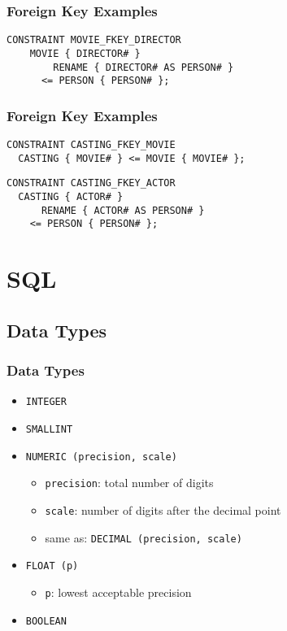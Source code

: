 \documentclass[dvipsnames]{beamer}
\theoremstyle{plain}
\begin{document}
\begin{frame}[fragile]
  \frametitle{Foreign Key Examples}

  \begin{lstlisting}
CONSTRAINT MOVIE_FKEY_DIRECTOR
    MOVIE { DIRECTOR# }
        RENAME { DIRECTOR# AS PERSON# }
      <= PERSON { PERSON# };
  \end{lstlisting}
\end{frame}

\begin{frame}[fragile]
  \frametitle{Foreign Key Examples}

  \begin{lstlisting}
CONSTRAINT CASTING_FKEY_MOVIE
  CASTING { MOVIE# } <= MOVIE { MOVIE# };
  \end{lstlisting}

  \begin{lstlisting}
CONSTRAINT CASTING_FKEY_ACTOR
  CASTING { ACTOR# }
      RENAME { ACTOR# AS PERSON# }
    <= PERSON { PERSON# };
  \end{lstlisting}
\end{frame}

\lstset{language=FullSQL}

\section{SQL}

\subsection{Data Types}

\begin{frame}
  \frametitle{Data Types}

  \begin{itemize}
    \item \texttt{INTEGER}
    \item \texttt{SMALLINT}

    \medskip
    \item \texttt{NUMERIC (precision, scale)}
    \begin{itemize}
      \item \texttt{precision}: total number of digits
      \item \texttt{scale}: number of digits after the decimal point
      \item same as: \texttt{DECIMAL (precision, scale)}
    \end{itemize}

    \medskip
    \item \texttt{FLOAT (p)}
    \begin{itemize}
      \item \texttt{p}: lowest acceptable precision
    \end{itemize}

    \medskip
    \item \texttt{BOOLEAN}
  \end{itemize}
\end{frame}
\end{document}

